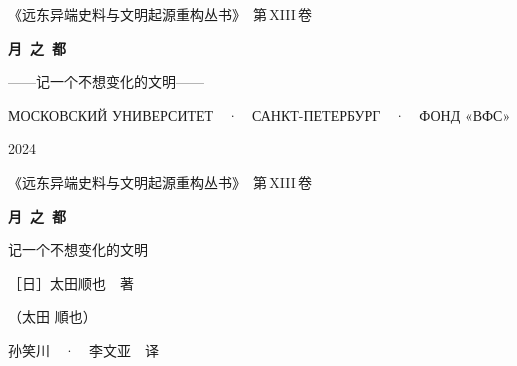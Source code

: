 \clearpage
\makeatletter\@mainmatterfalse\makeatother
{}
\pagestyle{frontmatterpage}

\thispagestyle{empty}
\begingroup
\centering
\vspace*{7mm}

{\sffamily\footnotesize\color{pencil}
《远东异端史料与文明起源重构丛书》\ 第\,XIII\,卷\par}

\vspace{27mm}

{\fontsize{26pt}{34pt}\selectfont\bfseries 月\ 之\ 都\par}
\vspace{8mm}
{\large ——记一个不想变化的文明——\par}

\vfill

{\sffamily\footnotesize\color{pencil}
МОСКОВСКИЙ УНИВЕРСИТЕТ\ \ ·\ \ САНКТ-ПЕТЕРБУРГ\ \ ·\ \ ФОНД «ВФС»\par}
\vspace{4mm}
{\footnotesize\color{pencil} 2024\par}
\endgroup
\clearpage


\thispagestyle{empty}
\begingroup
\centering
\vspace*{3mm}

{\sffamily\footnotesize\color{pencil}
《远东异端史料与文明起源重构丛书》\ 第\,XIII\,卷\par}

\vspace{20mm}

{\fontsize{30pt}{38pt}\selectfont\bfseries 月\ 之\ 都\par}
\vspace{7mm}
{\large 记一个不想变化的文明\par}

\vspace{16mm}

{\large ［日］太田顺也\ \ 著\par}
\vspace{3mm}
{\footnotesize\color{pencil}（太田 順也）\par}

\vspace{12mm}

{\normalsize 孙笑川\ \ ·\ \ 李文亚\ \ 译\par}

